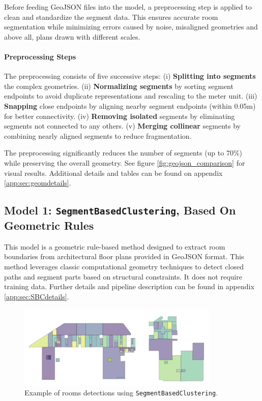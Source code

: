 \documentclass[11pt]{article}
\begin{document}
Before feeding GeoJSON files into the model, a preprocessing step is applied to 
clean and standardize the segment data. This ensures accurate room segmentation 
while minimizing errors caused by noise, misaligned geometries and above all,
plans drawn with different scales.

\paragraph{Preprocessing Steps}
The preprocessing consists of five successive steps:
(i) \textbf{Splitting into segments} the complex geometries.
(ii) \textbf{Normalizing segments} by sorting segment endpoints to avoid duplicate representations and rescaling to the meter unit.
(iii) \textbf{Snapping} close endpoints by aligning nearby segment endpoints (within 0.05m) for better connectivity.
(iv) \textbf{Removing isolated} segments by eliminating segments not connected to any others.
(v) \textbf{Merging collinear} segments by combining nearly aligned segments to reduce fragmentation.

The preprocessing significantly reduces the number of segments (up to 70\%) while 
preserving the overall geometry. See figure \ref{fig:geojson_comparison} for visual 
results.
Additional details and tables can be found on appendix \ref{app:sec:geomdetails}.


\subsection{Model 1: \texttt{SegmentBasedClustering}, Based On Geometric Rules}

This model is a geometric rule-based method designed to extract room boundaries
from architectural floor plans provided in GeoJSON format.
This method 
leverages classic computational geometry techniques to detect closed paths
and segment parts based on structural constraints. It does not require training data.
Further details and pipeline description can be found in appendix \ref{app:sec:SBCdetails}. 


\begin{figure}[h]
    \centering
    \includegraphics[width=0.6\linewidth, height=4cm, keepaspectratio]{figures/simplemodel.png}
    \caption{Example of rooms detections using \texttt{SegmentBasedClustering}.}
    \label{fig:closed_paths}
\end{figure}
\end{document}
